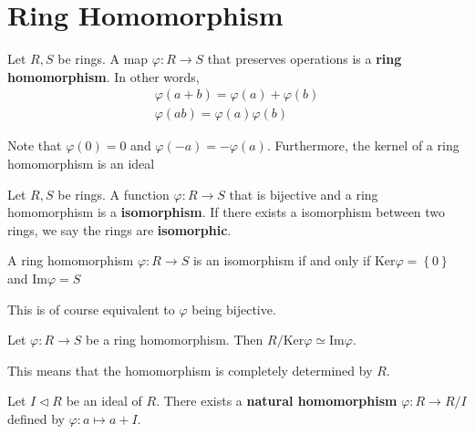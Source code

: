 \documentclass{memoir}
\begin{document}
\section{Ring Homomorphism}	
\begin{defn}
	Let \(R,S\) be rings. A map \(\varphi:R\to S\) that preserves operations is a \textbf{ring homomorphism}. In other words,
	\begin{align*}
		\varphi(a+b) = \varphi(a)+\varphi(b) \\
		\varphi(ab) = \varphi(a)\varphi(b)
	\end{align*}
\end{defn}
Note that \(\varphi(0) = 0\) and \(\varphi(-a) = -\varphi(a)\). Furthermore, the kernel of a ring homomorphism is an ideal
\begin{defn}[Isomorphism]
	Let \(R,S\) be rings. A function \(\varphi:R\to S\) that is bijective and a ring homomorphism is a \textbf{isomorphism}. If there exists a isomorphism between two rings, we say the rings are \textbf{isomorphic}. 
\end{defn}
\begin{prop}
	A ring homomorphism \(\varphi:R\to S\) is an isomorphism if and only if \( \textrm{Ker}\varphi = \left\{ 0 \right\} \) and \( \textrm{Im}\varphi = S\)
\end{prop}
This is of course equivalent to \(\varphi\) being bijective.
\begin{thm}
	Let \(\varphi:R\to S\) be a ring homomorphism. Then \(R / \textrm{Ker}\varphi \simeq \textrm{Im}\varphi\).
\end{thm}
This means that the homomorphism is completely determined by \(R\).
\begin{defn}
	Let \(I \triangleleft R\) be an ideal of \(R\). There exists a \textbf{natural homomorphism}  \(\varphi:R\to R / I\) defined by \(\varphi:a\mapsto a+I\).
\end{defn}
\end{document}
